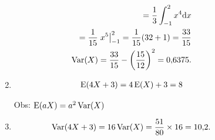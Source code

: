 \begin{description}
\begin{description}
\begin{enumerate}[label=(\alph*)]
\begin{align*}
                 =\frac{1}{3}\int_{-1}^{2} x^4 \mathrm{d}x\\
               =\frac{1}{15}\left.x^5\right\rvert_{-1}^{2}
               =\frac{1}{15}(32+1)=\frac{33}{15}\\
               \operatorname{Var}(X)=\frac{33}{15}-\left(\frac{15}{12}\right)^2=0{,}6375.
             \end{align*}
           \item 
             \begin{align*}
               \operatorname{E}(4X+3)=4\operatorname{E}(X)+3
               =8
             \end{align*}
             \begin{description}
             Obs: $\operatorname{E}(aX)= a^2 \operatorname{Var}(X)$
           \end{description} 
         \item 
           \begin{align*}
             \operatorname{Var}(4X+3) = 16 \operatorname{Var}(X)= \frac{51}{80}\times16= 10{,}2.
           \end{align*}
         \end{enumerate}
       \end{description}
     \end{description}
